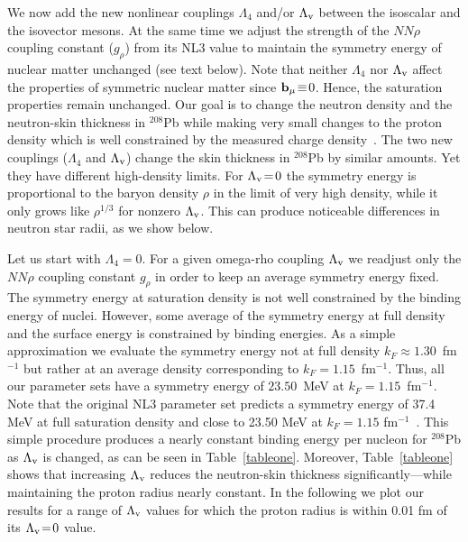 We now add the new nonlinear couplings $\Lambda_4$ and/or
$\Lambda_{\rm v}$ between the isoscalar and the isovector mesons. At
the same time we adjust the strength of the $NN\rho$ coupling constant
($g_\rho$) from its NL3 value to maintain the symmetry energy of
nuclear matter unchanged (see text below). Note that 
neither $\Lambda_4$ nor $\Lambda_{\rm v}$ affect the properties of 
symmetric nuclear matter since ${\bf b}_\mu\!\equiv\!0$. Hence, 
the saturation properties remain unchanged. Our goal is to change 
the neutron density and the neutron-skin thickness in $^{208}$Pb 
while making very small changes to the proton density which is well 
constrained by the measured charge density~\cite{sick}. The two 
new couplings ($\Lambda_4$ and $\Lambda_{\rm v}$) change the skin 
thickness in $^{208}$Pb by similar amounts. Yet they have different 
high-density limits\cite{horst}. For $\Lambda_{\rm v}\!=\!0$ 
the symmetry energy 
is proportional to the baryon density $\rho$ in the limit of very 
high density, while it only grows like $\rho^{1/3}$ for nonzero 
$\Lambda_{\rm v}$. This can produce noticeable differences in 
neutron star radii, as we show below.

Let us start with $\Lambda_4\!=\!0$. For a given omega-rho coupling
$\Lambda_{\rm v}$ we readjust only the $NN\rho$ coupling constant
$g_\rho$ in order to keep an average symmetry energy fixed. The 
symmetry energy at saturation density is not well constrained by 
the binding energy of nuclei. However, some average of the symmetry 
energy at full density and the surface energy is constrained 
by binding energies. As a simple approximation we evaluate the 
symmetry energy not at full density $k_F\!\approx\!1.30$~fm$^{-1}$ 
but rather at an average density corresponding to 
$k_F\!=\!1.15$~fm$^{-1}$. Thus, all our parameter sets have a 
symmetry energy of $23.50$~MeV at $k_F\!=\!1.15$~fm$^{-1}$. Note 
that the original NL3 parameter set predicts a symmetry energy of 
37.4 MeV at full saturation density and close to 23.50 MeV at 
$k_F\!=\!1.15$ fm$^{-1}$~\cite{NL3}. This simple procedure produces 
a nearly constant binding energy per nucleon for $^{208}$Pb as 
$\Lambda_{\rm v}$ is changed, as can be seen in Table~\ref{tableone}. 
Moreover, Table~\ref{tableone} shows that increasing $\Lambda_{\rm v}$ 
reduces the neutron-skin thickness significantly---while maintaining 
the proton radius nearly constant. In the following we plot our 
results for a range of $\Lambda_{\rm v}$ values for which the 
proton radius is within 0.01 fm of its $\Lambda_{\rm v}\!=\!0$ 
value.

